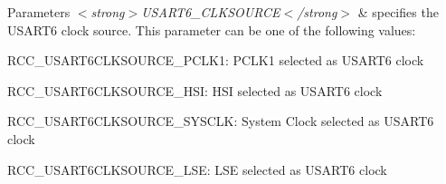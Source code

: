 \begin{DoxyParams}{Parameters}
{\em $<$strong$>$\+U\+S\+A\+R\+T6\+\_\+\+C\+L\+K\+S\+O\+U\+R\+C\+E$<$/strong$>$} & specifies the U\+S\+A\+R\+T6 clock source. This parameter can be one of the following values\+: \begin{DoxyItemize}
\item R\+C\+C\+\_\+\+U\+S\+A\+R\+T6\+C\+L\+K\+S\+O\+U\+R\+C\+E\+\_\+\+P\+C\+L\+K1\+: P\+C\+L\+K1 selected as U\+S\+A\+R\+T6 clock \item R\+C\+C\+\_\+\+U\+S\+A\+R\+T6\+C\+L\+K\+S\+O\+U\+R\+C\+E\+\_\+\+H\+SI\+: H\+SI selected as U\+S\+A\+R\+T6 clock \item R\+C\+C\+\_\+\+U\+S\+A\+R\+T6\+C\+L\+K\+S\+O\+U\+R\+C\+E\+\_\+\+S\+Y\+S\+C\+LK\+: System Clock selected as U\+S\+A\+R\+T6 clock \item R\+C\+C\+\_\+\+U\+S\+A\+R\+T6\+C\+L\+K\+S\+O\+U\+R\+C\+E\+\_\+\+L\+SE\+: L\+SE selected as U\+S\+A\+R\+T6 clock \end{DoxyItemize}
\\
\hline
\end{DoxyParams}
